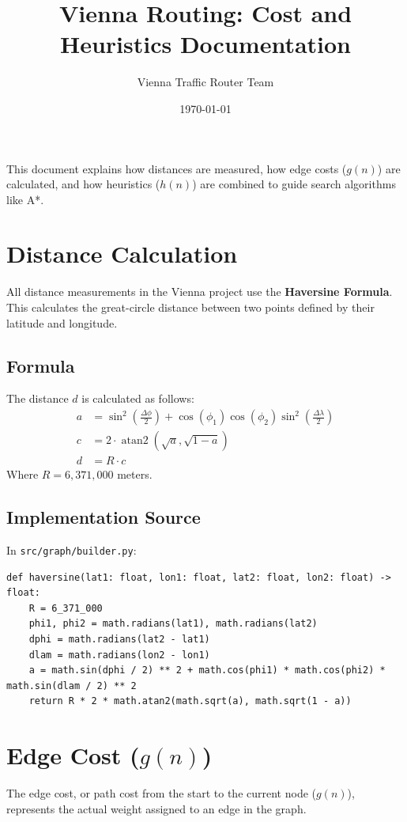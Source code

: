 \documentclass[11pt,a4paper]{article}
\title{Vienna Routing: Cost and Heuristics Documentation}
\author{Vienna Traffic Router Team}
\date{\today}
\begin{document}
\maketitle

This document explains how distances are measured, how edge costs ($g(n)$) are calculated, and how heuristics ($h(n)$) are combined to guide search algorithms like A*.

\section{Distance Calculation}

All distance measurements in the Vienna project use the \textbf{Haversine Formula}. This calculates the great-circle distance between two points defined by their latitude and longitude.

\subsection{Formula}
The distance $d$ is calculated as follows:
\begin{align*}
a &= \sin^2\left(\frac{\Delta\phi}{2}\right) + \cos(\phi_1)\cos(\phi_2)\sin^2\left(\frac{\Delta\lambda}{2}\right) \\
c &= 2 \cdot \operatorname{atan2}\left(\sqrt{a}, \sqrt{1-a}\right) \\
d &= R \cdot c
\end{align*}
Where $R = 6,371,000$ meters.

\subsection{Implementation Source}
In \texttt{src/graph/builder.py}:
\begin{lstlisting}
def haversine(lat1: float, lon1: float, lat2: float, lon2: float) -> float:
    R = 6_371_000
    phi1, phi2 = math.radians(lat1), math.radians(lat2)
    dphi = math.radians(lat2 - lat1)
    dlam = math.radians(lon2 - lon1)
    a = math.sin(dphi / 2) ** 2 + math.cos(phi1) * math.cos(phi2) * math.sin(dlam / 2) ** 2
    return R * 2 * math.atan2(math.sqrt(a), math.sqrt(1 - a))
\end{lstlisting}

\section{Edge Cost ($g(n)$)}

The edge cost, or path cost from the start to the current node ($g(n)$), represents the actual weight assigned to an edge in the graph.
\end{document}
